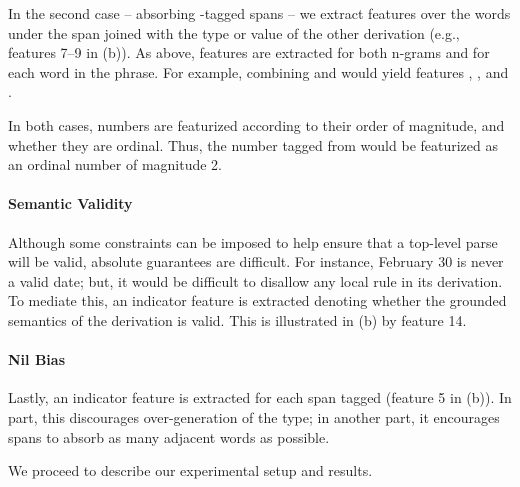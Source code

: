 In the second case -- absorbing -tagged spans --
  we extract features over the words under the  span joined with
  the type or value of the other derivation
  (e.g., features 7--9 in  (b)).
As above, features are extracted for both n-grams and for each word in
  the phrase.
For example, combining  and  would yield features
  ,
  , and
  .

In both cases, numbers are featurized according to their order of magnitude,
  and whether they are ordinal.
Thus, the number tagged from  would be featurized as an
  ordinal number of magnitude 2.

\paragraph{Semantic Validity}
Although some constraints can be imposed to help ensure that a top-level parse
  will be valid, absolute guarantees are difficult.
For instance, February 30 is never a valid date; but, it would be difficult
  to disallow any local rule in its derivation.
To mediate this, an indicator feature is extracted
  denoting whether the grounded semantics of the derivation is
  valid.
This is illustrated in  (b) by feature 14.

\paragraph{Nil Bias}
Lastly, an indicator feature is extracted for each  span tagged
  (feature 5 in  (b)).
In part, this discourages over-generation of the type; in another part,
  it encourages  spans to absorb as many adjacent words as possible.


We proceed to describe our experimental setup and results.
